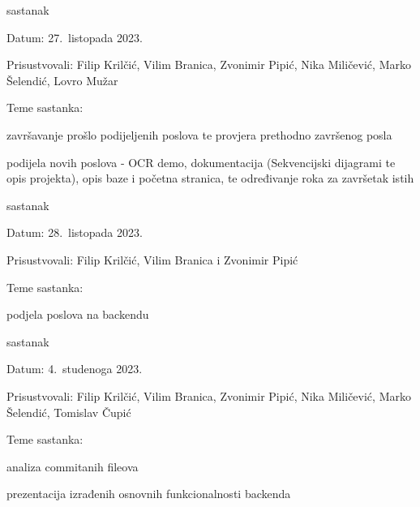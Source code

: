 \begin{packed_enum}
			\item  sastanak
			\item[] \begin{packed_item}
				\item Datum: 27.\ listopada 2023.
				\item Prisustvovali: Filip Krilčić, Vilim Branica, Zvonimir Pipić, Nika Miličević, Marko Šelendić, Lovro Mužar
				\item Teme sastanka:
				\begin{packed_item}
					\item  završavanje prošlo podijeljenih poslova te provjera prethodno završenog posla
					\item  podijela novih poslova - OCR demo, dokumentacija (Sekvencijski dijagrami te opis projekta), opis baze i početna stranica, te određivanje roka za završetak istih
				\end{packed_item}
			\end{packed_item}
			
			\item  sastanak
			\item[] \begin{packed_item}
				\item Datum: 28.\ listopada 2023.
				\item Prisustvovali: Filip Krilčić, Vilim Branica i Zvonimir Pipić
				\item Teme sastanka:
				\begin{packed_item}
					\item  podjela poslova na backendu
				\end{packed_item}
			\end{packed_item}
			
			\item  sastanak
			\item[] \begin{packed_item}
				\item Datum: 4.\ studenoga 2023.
				\item Prisustvovali: Filip Krilčić, Vilim Branica, Zvonimir Pipić, Nika Miličević, Marko Šelendić, Tomislav Čupić
				\item Teme sastanka:
				\begin{packed_item}
					\item  analiza commitanih fileova
					\item  prezentacija izrađenih osnovnih funkcionalnosti backenda
				\end{packed_item}
			\end{packed_item}


\end{packed_enum}
